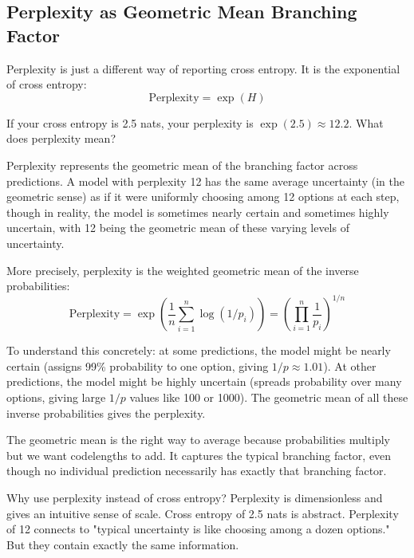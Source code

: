 \vspace{1.5em}

\subsection{Perplexity as Geometric Mean Branching Factor}

Perplexity is just a different way of reporting cross entropy. It is the exponential of cross entropy:
\begin{equation}
\text{Perplexity} = \exp(H)
\end{equation}

If your cross entropy is 2.5 nats, your perplexity is $\exp(2.5) \approx 12.2$. What does perplexity mean? 

Perplexity represents the geometric mean of the branching factor across predictions. A model with perplexity 12 has the same average uncertainty (in the geometric sense) as if it were uniformly choosing among 12 options at each step, though in reality, the model is sometimes nearly certain and sometimes highly uncertain, with 12 being the geometric mean of these varying levels of uncertainty.

More precisely, perplexity is the weighted geometric mean of the inverse probabilities:
\begin{equation}
\text{Perplexity} = \exp\left(\frac{1}{n}\sum_{i=1}^{n} \log(1/p_i)\right) = \left(\prod_{i=1}^{n} \frac{1}{p_i}\right)^{1/n}
\end{equation}

To understand this concretely: at some predictions, the model might be nearly certain (assigns 99\% probability to one option, giving $1/p \approx 1.01$). At other predictions, the model might be highly uncertain (spreads probability over many options, giving large $1/p$ values like 100 or 1000). The geometric mean of all these inverse probabilities gives the perplexity.

The geometric mean is the right way to average because probabilities multiply but we want codelengths to add. It captures the typical branching factor, even though no individual prediction necessarily has exactly that branching factor.

Why use perplexity instead of cross entropy? Perplexity is dimensionless and gives an intuitive sense of scale. Cross entropy of 2.5 nats is abstract. Perplexity of 12 connects to "typical uncertainty is like choosing among a dozen options." But they contain exactly the same information.


